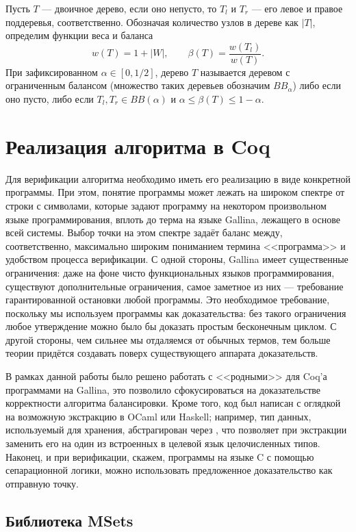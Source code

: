 \documentclass[a4paper,14pt]{extarticle}
\begin{document}
Пусть \( T \) --- двоичное дерево,
если оно непусто, то
\( T_l \) и \( T_r \) ---
его левое и правое поддеревья, соответственно.
Обозначая количество узлов в дереве как \( |T| \),
определим функции веса и баланса
\[
  w(T) = 1 + |W|, \qquad
  \beta(T) = \frac{w(T_l)}{w(T)}.
\]
При зафиксированном \( \alpha \in [0, 1/2] \),
дерево \( T \) называется
деревом с ограниченным балансом
(множество таких деревьев обозначим \( BB_\alpha \))
либо если оно пусто,
либо если \( T_l, T_r \in BB(\alpha) \)
и \( \alpha \leqslant \beta(T) \leqslant 1 - \alpha \).


\clearpage
\section{Реализация алгоритма в Coq}

Для верификации алгоритма необходимо иметь его реализацию в виде конкретной программы. 
При этом, понятие программы может лежать на широком спектре от строки с
символами, которые задают программу на некотором произвольном языке
программирования, вплоть до терма на языке Gallina, лежащего в основе всей
системы. Выбор точки на этом спектре задаёт баланс между, соответственно,
максимально широким пониманием термина <<программа>> и удобством процесса
верификации. С одной стороны, Gallina имеет существенные ограничения: даже
на фоне чисто функциональных языков программирования, существуют дополнительные
ограничения, самое заметное из них --- требование гарантированной остановки любой
программы. Это необходимое требование, поскольку мы используем программы как
доказательства: без такого ограничения любое утверждение можно было бы доказать
простым бесконечным циклом. С другой стороны, чем сильнее мы отдаляемся от обычных термов, тем
больше теории придётся создавать поверх существующего аппарата доказательств.

В рамках данной работы было решено работать
с <<родными>> для Coq'а программами на Gallina,
это позволило сфокусироваться на доказательстве
корректности алгоритма балансировки.
Кроме того, код был написан с оглядкой на
возможную экстракцию в OCaml или Haskell;
например, тип данных, используемый для хранения,
абстрагирован через ,
что позволяет при экстракции заменить его
на один из встроенных в целевой язык целочисленных типов.
Наконец, и при верификации, скажем, программы на языке C
с помощью сепарационной логики,
можно использовать предложенное доказательство
как отправную точку.

\subsection{Библиотека MSets}
\end{document}
